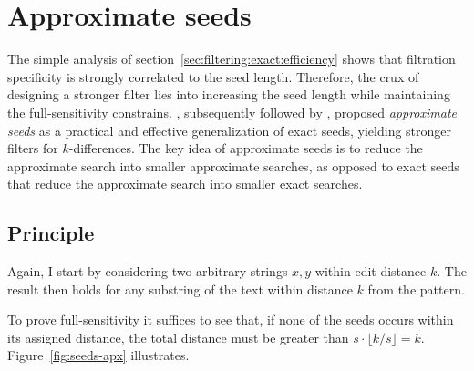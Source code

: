 
\section{Approximate seeds}
\label{sec:seeds-apx}

The simple analysis of section~\ref{sec:filtering:exact:efficiency} shows that filtration specificity is strongly correlated to the seed length.
Therefore, the crux of designing a stronger filter lies into increasing the seed length while maintaining the full-sensitivity constrains.
\citeauthor{Myers1994}, subsequently followed by \citeauthor{Navarro2000}, proposed \emph{approximate seeds} as a practical and effective generalization of exact seeds, yielding stronger filters for $k$-differences.
The key idea of approximate seeds is to reduce the approximate search into smaller approximate searches, as opposed to exact seeds that reduce the approximate search into smaller exact searches.

\subsection{Principle}

Again, I start by considering two arbitrary strings $x,y$ within edit distance $k$.
The result then holds for any substring of the text within distance $k$ from the pattern.
To prove full-sensitivity it suffices to see that, if none of the seeds occurs within its assigned distance, the total distance must be greater than $s \cdot \lfloor k/s \rfloor = k$.
Figure~\ref{fig:seeds-apx} illustrates.

